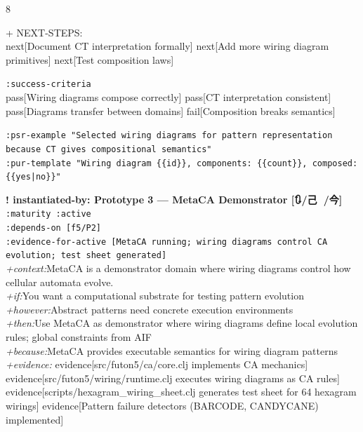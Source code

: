 \documentclass[landscape]{article}
\newcommand{\flexitag}[1]{\textcolor[gray]{0.35}{\textit{#1}}}
\newenvironment{devmapactive}{%
  \def\FrameCommand{\colorbox{devmapactivebg}}%
  \setlength{\fboxsep}{2pt}%
  \MakeFramed{\advance\hsize-\width \FrameRestore}%
}{\endMakeFramed}
\begin{document}
\begin{paracol}{8}
\begin{devmapactive}
\par
  + NEXT-STEPS:\\
    next[Document CT interpretation formally] next[Add more wiring diagram primitives] next[Test composition laws]\\
\par
  \texttt{:\allowbreak{}success-\allowbreak{}criteria}\\
    pass[Wiring diagrams compose correctly] pass[CT interpretation consistent] pass[Diagrams transfer between domains] fail[Composition breaks semantics]\\
\par
  \texttt{:\allowbreak{}psr-\allowbreak{}example "Selected wiring diagrams for pattern representation because CT gives compositional semantics"}\\
  \texttt{:\allowbreak{}pur-\allowbreak{}template "Wiring diagram \{\{id\}\},\allowbreak{} components:\allowbreak{} \{\{count\}\},\allowbreak{} composed:\allowbreak{} \{\{yes|\allowbreak{}no\}\}"}\\
\par
\par
\end{devmapactive}
\begin{devmapactive}
\textbf{! instantiated-by: Prototype 3 — MetaCA Demonstrator [🔃/己 🔺/今]}\\
  \texttt{:\allowbreak{}maturity :\allowbreak{}active}\\
  \texttt{:\allowbreak{}depends-\allowbreak{}on [f5/\allowbreak{}P2]}\\
  \texttt{:\allowbreak{}evidence-\allowbreak{}for-\allowbreak{}active [MetaCA running;\allowbreak{} wiring diagrams control CA evolution;\allowbreak{} test sheet generated]}\\
  \flexitag{+context:}MetaCA is a demonstrator domain where wiring diagrams control how cellular automata evolve.\\
  \flexitag{+if:}You want a computational substrate for testing pattern evolution\\
  \flexitag{+however:}Abstract patterns need concrete execution environments\\
  \flexitag{+then:}Use MetaCA as demonstrator where wiring diagrams define local evolution rules; global constraints from AIF\\
  \flexitag{+because:}MetaCA provides executable semantics for wiring diagram patterns\\
  \flexitag{+evidence:} evidence[src/futon5/ca/core.clj implements CA mechanics] evidence[src/futon5/wiring/runtime.clj executes wiring diagrams as CA rules] evidence[scripts/hexagram\_wiring\_sheet.clj generates test sheet for 64 hexagram wirings] evidence[Pattern failure detectors (BARCODE, CANDYCANE) implemented]\\

\end{devmapactive}
\end{paracol}
\end{document}
